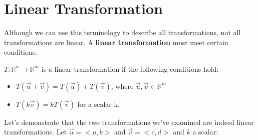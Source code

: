 \documentclass{article}
\begin{document}
\section{Linear Transformation}
\par \noindent Although we can use this terminology to describe all transformations, not all transformations are linear. A \textbf{linear transformation} must meet certain conditions.
\newline
\par \noindent \(T: \mathbb{R}^n \rightarrow \mathbb{R}^m\) is a linear transformation if the following conditions hold:
\begin{itemize}
	\item \(T(\vec u + \vec v) = T(\vec u) + T(\vec v)\), where \(\vec u,\vec v \in \mathbb{R}^m\)
	\item \(T(k \vec v) = k T( \vec v)\) for a scalar k.
\end{itemize}
\par \noindent Let's demonstrate that the two transformations we've examined are indeed linear transformations. Let \(\vec u=<a,b>\) and \( \vec v = <c,d>\) and \(k\) a scalar:
\newline
\newline
\end{document}
